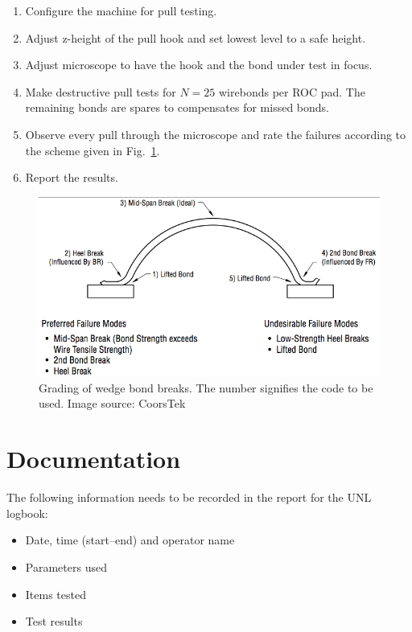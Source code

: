 \documentclass[10pt]{unlsilabsop}
\begin{document}
\begin{enumerate}
    \item Configure the machine for pull testing.
    \item Adjust z-height of the pull hook and set lowest level to a safe height.
    \item Adjust microscope to have the hook and the bond under test in focus.
    \item Make destructive pull tests for $N=25$ wirebonds per ROC pad. The remaining bonds are spares to compensates for missed bonds.
    \item Observe every pull through the microscope and rate the failures according to the scheme given in Fig.~\ref{fig:grading}.
    \item Report the results.
\end{enumerate}

\begin{figure}[h]
    \begin{center}
        \includegraphics[width=12cm]{img/GradingWedgeBondBreaks.png}
        \caption{Grading of wedge bond breaks. The number signifies the code to be used. Image source: CoorsTek}
        \label{fig:grading}
    \end{center}
\end{figure}

\section{Documentation}
The following information needs to be recorded in the report for the UNL logbook:
\begin{itemize}
\item Date, time (start--end) and operator name
\item Parameters used
\item Items tested
\item Test results
\end{itemize}
\end{document}
